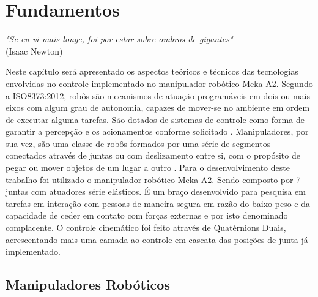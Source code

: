 \chapter{Fundamentos}\label{ch:teory-reference}

\begin{flushright}
\textit{"Se eu vi mais longe, foi por estar sobre ombros de gigantes"}\\ (Isaac Newton)
\end{flushright}



Neste capítulo será apresentado os aspectos teóricos e técnicos das tecnologias envolvidas no controle implementado no manipulador robótico Meka A2. Segundo a ISO8373:2012, robôs são mecanismos de atuação programáveis em dois ou mais eixos com algum grau de autonomia, capazes de mover-se no ambiente em ordem de executar alguma tarefas. São dotados de sistemas de controle como forma de garantir a percepção e os acionamentos conforme solicitado \cite{nobody}. Manipuladores, por sua vez, são uma classe de robôs formados por uma série de segmentos conectados através de juntas ou com deslizamento entre si, com o propósito de pegar ou mover objetos de um lugar a outro \cite{nobody}. Para o desenvolvimento deste trabalho foi utilizado o manipulador robótico Meka A2. Sendo composto por 7 juntas com atuadores série elásticos. É um braço desenvolvido para pesquisa em tarefas em interação com pessoas de maneira segura em razão do baixo peso e da capacidade de ceder em contato com forças externas e por isto denominado complacente. O controle cinemático foi feito através de Quatérnions Duais, acrescentando mais uma camada ao controle em cascata das posições de junta já implementado.

\section{Manipuladores Robóticos} 

